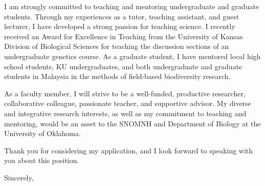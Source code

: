 \documentclass[letterpaper, 10pt]{letter}
\begin{document}
\begin{letter}

I am strongly committed to teaching and mentoring undergraduate and graduate
students.
Through my experiences as a tutor, teaching assistant, and guest lecturer, I
have developed a strong passion for teaching science.
I recently received an Award for Excellence in Teaching from the University of
Kansas Division of Biological Sciences for teaching the discussion sections of
an undergraduate genetics course.
As a graduate student, I have mentored local high school students, KU
undergraduates, and both undergraduate and graduate students in Malaysia in the
methods of field-based biodiversity research.

As a faculty member, I will strive to be a well-funded, productive researcher,
collaborative colleague, passionate teacher, and supportive advisor.
My diverse and integrative research interests, as well as my commitment to
teaching and mentoring, would be an asset to the SNOMNH and Department of
Biology at the University of Oklahoma.

Thank you for considering my application, and I look forward to speaking with
you about this position.

\addtolength{\medskipamount}{-5pt}
\closing{Sincerely,}
\end{letter}
\end{document}
